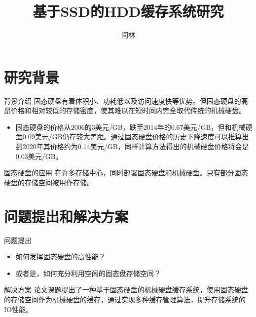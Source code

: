 \documentclass[compress]{beamer}
\title{基于SSD的HDD缓存系统研究}
\author{闫林}
\institute{
计算机学院\\
西安电子科技大学\\
\vspace{5mm}
指导教师：刘凯教授
}
\begin{document}
\begin{frame}[plain] %
  \titlepage
\end{frame}


\section{研究背景}
\begin{frame}{背景介绍}
固态硬盘有着体积小、功耗低以及访问速度快等优势。但固态硬盘的高昂价格和相对较低的存储密度，使其难以在短时间内完全取代传统的机械硬盘。
\begin{itemize}
    \item 固态硬盘的价格从2006的3美元/GB，跌至2014年的0.67美元/GB，但和机械硬盘0.09美元/GB仍存较大差距。通过固态硬盘价格的历史下降速度可以推算出到2020年其价格约为0.14美元/GB，同样计算方法得出的机械硬盘价格将会是0.03美元/GB。
\end{itemize}
\end{frame}

\begin{frame}{固态硬盘的应用}
在许多存储中心，同时部署固态硬盘和机械硬盘。只有部分固态硬盘的存储空间被用作存储。
\end{frame}

\section{问题提出和解决方案}
\begin{frame}{问题提出}
\begin{itemize}
    \item 如何发挥固态硬盘的高性能？
    \item 或者是，如何充分利用空闲的固态盘存储空间？
\end{itemize}
\end{frame}

\begin{frame}{解决方案}
论文课题提出了一种基于固态硬盘的机械硬盘缓存系统，使用固态硬盘的存储空间作为机械硬盘的缓存，通过实现多种缓存管理算法，提升存储系统的IO性能。
\end{frame}
\end{document}
